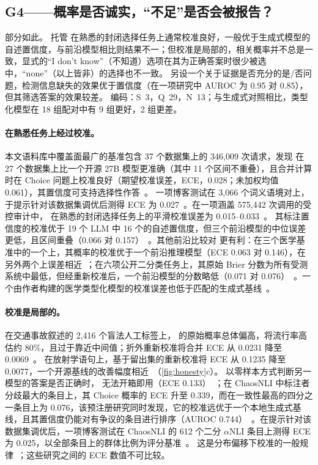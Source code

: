 \subsection{G4——概率是否诚实，“不足”是否会被报告？}
\label{sec:g4}

\begin{answerbox}
部分如此。
托管 \jev{} 在熟悉的封闭选择任务上通常校准良好，一般优于生成式模型的自述置信度，与前沿模型相比则结果不一；但校准是局部的，相关概率并不总是一致，显式的“I don't know”（不知道）选项在其为正确答案时很少被选中，“none”（以上皆非）的选择也不一致。
另设一个关于证据是否充分的是/否问题，检测信息缺失的效果优于置信度（在一项研究中 AUROC 为 0.95 对 0.85），但其筛选答案的效果较差。
编码：S~3，Q~29，N~13；与生成式对照相比，类型化模型在 18 组配对中有 9 组更好，2 组更差。
\end{answerbox}

\paragraph{在熟悉任务上经过校准。}
本文语料库中覆盖面最广的基准包含 37 个数据集上的 346{,}009 次请求，发现 \jev{} 在 27 个数据集上比一个开源 27B 模型更准确（其中 11 个区间不重叠），且合并计算时在 Choice 问题上校准良好（期望校准误差，ECE，0.028；未加权均值 0.061），其置信度可支持选择性作答~\cite{arx37647}。
一项博客测试在 3{,}066 个词义语境对上，于提示针对该数据集调优后测得 ECE 为 0.027~\cite{grazian2026calibrated}\gmark{}。在一项涵盖 575{,}442 次调用的受控审计中，\jev{} 在熟悉的封闭选择任务上的平滑校准误差为 0.015--0.033~\cite{arx01006}。
其标注置信度的校准优于 19 个 LLM 中 16 个的自述置信度，但三个前沿模型的中位误差更低，且区间重叠（0.066 对 0.157）~\cite{arx24574}。其他前沿比较对 \jev{} 更有利：在三个医学基准中的一个上，其概率的校准优于一个前沿推理模型（ECE 0.063 对 0.146），在另外两个上误差相近~\cite{arx34024}；在六项公开二分类任务上，其原始 Brier 分数为所有受测系统中最低，但经重新校准后，一个前沿模型的分数略低（0.071 对 0.076）~\cite{zen22885291}\zmark{}。一个由作者构建的医学类型化模型的校准误差也低于匹配的生成式基线~\cite{arx00381}。

\paragraph{校准是局部的。}
在交通事故叙述的 2{,}416 个盲法人工标签上，\jev{} 的原始概率总体偏高，将流行率高估约 80\%，且过于靠近中间值；折外重新校准将合并 ECE 从 0.0231 降至 0.0069~\cite{arx24052}。
在放射学语句上，基于留出集的重新校准将 ECE 从 0.1235 降至 0.0077，一个开源基线的改善幅度相近~\cite{arx27607}（\cref{fig:honesty}c）。
以零样本方式判断另一模型的答案是否正确时，\jev{} 无法开箱即用（ECE 0.133）~\cite{arx24881}；在 ChaosNLI 中标注者分歧最大的条目上，其 Choice 概率的 ECE 升至 0.339，而在一致性最高的四分之一条目上为 0.076，该预注册研究同时发现，它的校准远优于一个本地生成式基线，且其置信度仍能对有争议的条目进行排序（AUROC 0.744）~\cite{zen23032384}\zmark{}。在提示针对该数据集调优后，一项博客测试在 ChaosNLI 的 612 个二分 $\alpha$NLI 条目上测得 ECE 为 0.025，以全部条目上的群体比例为评分基准~\cite{grazian2026calibrated}\gmark{}。
这是分布偏移下校准的一般规律~\cite{ovadia2019trust}；这些研究之间的 ECE 数值不可比较。

